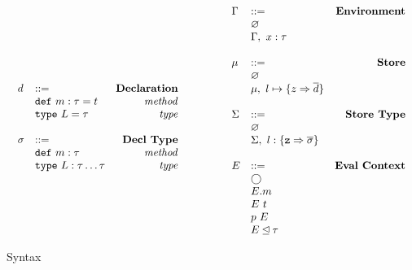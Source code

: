 \documentclass{llncs}
\numberwithin{subcase}{case}
\numberwithin{case}{theorem}
\numberwithin{case}{lemma}
\begin{document}
\begin{figure}[h]
\[\begin{array}{lllll}
\begin{array}{llr}
&&\\
d 		& ::= 														&\text{\bf{Declaration}} \\
  		& \text{\texttt{def}} \ m : \tau = t 				&\text{\emph{method}}\\
  		& \text{\texttt{type}} \ L = \tau					&\text{\emph{type}}\\
&&\\
\sigma	& ::= 														&\text{\bf{Decl Type}}\\
		& \text{\texttt{def}} \ m:\tau						&\text{\emph{method}}\\
  		& \text{\texttt{type}} \ L : \tau \ldots  \tau			&\text{\emph{type}}\\
\end{array}
& ~~~~~~
&
\begin{array}{llr}
\Gamma	& :: = 													&\text{\bf{Environment}} \\
		& \varnothing 											&\\
		& \Gamma,\ x : \tau 									&\\
&&\\
\mu 	& :: = 													& \text{\bf{Store}}\\
		& \varnothing 											&\\
		& \mu,\ l \mapsto \{z \Rightarrow \overline{d}\}	&\\
&&\\
\Sigma	& :: = 													&\text{\bf{Store Type}}\\
		& \varnothing 											&\\
		& \Sigma,\ l : \{\texttt{z} \Rightarrow \overline{\sigma}\}	&\\
&&\\
E 		& :: = 													& \text{\bf{Eval Context}}\\
		& \bigcirc 												&\\
		& E.m 														&\\
		& E\ t 													&\\
		& p\ E 													&\\
		& E \unlhd \tau											&\\
\end{array}
\end{array}
\]
\caption{Syntax}
\label{f:syntax}
\end{figure}
\end{document}
